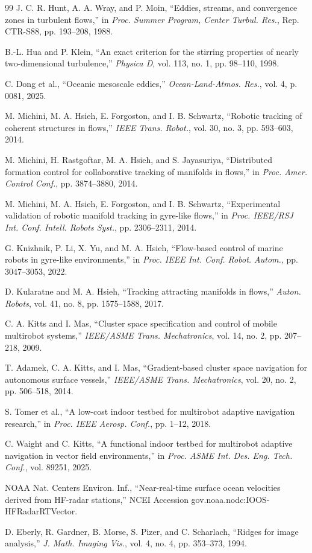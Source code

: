 \documentclass[lettersize,journal]{IEEEtran}
\begin{document}
\begin{thebibliography}{99}
 J. C. R. Hunt, A. A. Wray, and P. Moin, ``Eddies, streams, and
convergence zones in turbulent flows,'' in \textit{Proc. Summer Program,
Center Turbul. Res.}, Rep. CTR-S88, pp. 193--208, 1988.

 B.-L. Hua and P. Klein, ``An exact criterion for the stirring
properties of nearly two-dimensional turbulence,'' \textit{Physica D}, vol. 113,
no. 1, pp. 98--110, 1998.

 C. Dong et al., ``Oceanic mesoscale eddies,''
\textit{Ocean-Land-Atmos. Res.}, vol. 4, p. 0081, 2025.

 M. Michini, M. A. Hsieh, E. Forgoston, and I. B. Schwartz,
``Robotic tracking of coherent structures in flows,'' \textit{IEEE Trans.
Robot.}, vol. 30, no. 3, pp. 593--603, 2014.

 M. Michini, H. Rastgoftar, M. A. Hsieh, and S. Jayasuriya,
``Distributed formation control for collaborative tracking of manifolds in
flows,'' in \textit{Proc. Amer. Control Conf.}, pp. 3874--3880, 2014.

 M. Michini, M. A. Hsieh, E. Forgoston, and I. B. Schwartz,
``Experimental validation of robotic manifold tracking in gyre-like flows,''
in \textit{Proc. IEEE/RSJ Int. Conf. Intell. Robots Syst.},
pp. 2306--2311, 2014.

 G. Knizhnik, P. Li, X. Yu, and M. A. Hsieh, ``Flow-based control
of marine robots in gyre-like environments,'' in \textit{Proc. IEEE Int. Conf.
Robot. Autom.}, pp. 3047--3053, 2022.

 D. Kularatne and M. A. Hsieh, ``Tracking attracting manifolds in
flows,'' \textit{Auton. Robots}, vol. 41, no. 8, pp. 1575--1588, 2017.

 C. A. Kitts and I. Mas, ``Cluster space specification and control
of mobile multirobot systems,'' \textit{IEEE/ASME Trans. Mechatronics},
vol. 14, no. 2, pp. 207--218, 2009.

 T. Adamek, C. A. Kitts, and I. Mas, ``Gradient-based cluster space
navigation for autonomous surface vessels,'' \textit{IEEE/ASME Trans.
Mechatronics}, vol. 20, no. 2, pp. 506--518, 2014.

 S. Tomer et al., ``A low-cost indoor testbed for multirobot
adaptive navigation research,'' in \textit{Proc. IEEE Aerosp. Conf.},
pp. 1--12, 2018.

 C. Waight and C. Kitts, ``A functional indoor testbed for
multirobot adaptive navigation in vector field environments,'' in
\textit{Proc. ASME Int. Des. Eng. Tech. Conf.}, vol. 89251, 2025.

 NOAA Nat. Centers Environ. Inf., ``Near-real-time surface
ocean velocities derived from HF-radar stations,'' NCEI Accession
gov.noaa.nodc:IOOS-HFRadarRTVector.

 D. Eberly, R. Gardner, B. Morse, S. Pizer, and C.
Scharlach, ``Ridges for image analysis,'' \textit{J. Math. Imaging Vis.},
vol. 4, no. 4, pp. 353--373, 1994.

\end{thebibliography}
\end{document}
